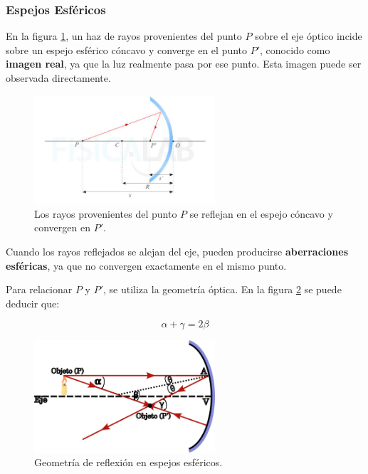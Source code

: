 \subsubsection*{Espejos Esféricos}

En la figura \ref{fig:espejo_esferico}, un haz de rayos provenientes del punto $P$ sobre el eje óptico incide sobre un espejo esférico cóncavo y converge en el punto $P'$, conocido como \textbf{imagen real}, ya que la luz realmente pasa por ese punto. Esta imagen puede ser observada directamente.

\begin{figure}[H]
	\centering
	\includegraphics[width=0.6\textwidth]{images/espejo_esferico_AV.jpg}
	\caption{Los rayos provenientes del punto $P$ se reflejan en el espejo cóncavo y convergen en $P'$.}
	\label{fig:espejo_esferico}
\end{figure}

Cuando los rayos reflejados se alejan del eje, pueden producirse \textbf{aberraciones esféricas}, ya que no convergen exactamente en el mismo punto.

Para relacionar $P$ y $P'$, se utiliza la geometría óptica. En la figura \ref{fig:geometria_espejos_imagen} se puede deducir que:

\begin{equation}
	\alpha + \gamma = 2\beta
\end{equation}

\begin{figure}[H]
	\centering
	\includegraphics[width=0.6\textwidth]{images/geometria_espejos.png}
	\caption{Geometría de reflexión en espejos esféricos.}
	\label{fig:geometria_espejos_imagen}
\end{figure}

